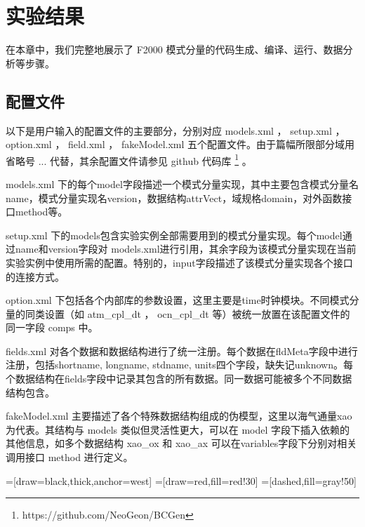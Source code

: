 
\chapter{实验结果}
\label{cha:experiment}

在本章中，我们完整地展示了 F2000 模式分量的代码生成、编译、运行、数据分析等步骤。

\section{配置文件}

以下是用户输入的配置文件的主要部分，分别对应 models.xml ， setup.xml ， option.xml ， field.xml ，  fakeModel.xml 五个配置文件。由于篇幅所限部分域用省略号 ... 代替，其余配置文件请参见 github 代码库 \footnote{https://github.com/NeoGeon/BCGen} 。

models.xml 下的每个model字段描述一个模式分量实现，其中主要包含模式分量名name，模式分量实现名version，数据结构attrVect，域规格domain，对外函数接口method等。

setup.xml 下的models包含实验实例全部需要用到的模式分量实现。每个model通过name和version字段对 models.xml进行引用，其余字段为该模式分量实现在当前实验实例中使用所需的配置。特别的，input字段描述了该模式分量实现各个接口的连接方式。

option.xml 下包括各个内部库的参数设置，这里主要是time时钟模块。不同模式分量的同类设置（如 atm\_cpl\_dt ， ocn\_cpl\_dt 等）被统一放置在该配置文件的同一字段 comps 中。

fields.xml 对各个数据和数据结构进行了统一注册。每个数据在fldMeta字段中进行注册，包括shortname, longname, stdname, units四个字段，缺失记unknown。每个数据结构在fields字段中记录其包含的所有数据。同一数据可能被多个不同数据结构包含。

fakeModel.xml 主要描述了各个特殊数据结构组成的伪模型，这里以海气通量xao为代表。其结构与 models 类似但灵活性更大，可以在 model 字段下插入依赖的其他信息，如多个数据结构 xao\_ox 和 xao\_ax 可以在variables字段下分别对相关调用接口 method 进行定义。

\usetikzlibrary{trees}
=[draw=black,thick,anchor=west]
=[draw=red,fill=red!30]
=[dashed,fill=gray!50]

